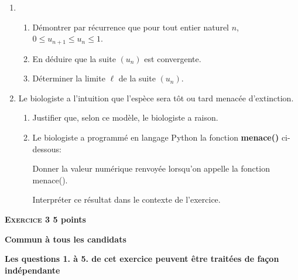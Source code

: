 \documentclass[11pt]{article}
\begin{document}
\begin{enumerate}[resume]
\item 
	\begin{enumerate}
		\item Démontrer par récurrence que pour tout entier naturel $n$,\, $0 \leqslant u_{n+1} \leqslant  u_n \leqslant 1$.
		\item En déduire que la suite $\left(u_n\right)$ est convergente.
		\item Déterminer la limite $\ell$ de la suite $\left(u_n\right)$.
	\end{enumerate}
\item Le biologiste a l'intuition que l'espèce sera tôt ou tard menacée d'extinction.
	\begin{enumerate}
		\item Justifier que, selon ce modèle, le biologiste a raison.
		\item Le biologiste a programmé en langage Python la fonction \textbf{menace()} ci-dessous:

\begin{center}
\end{center}

Donner la valeur numérique renvoyée lorsqu'on appelle la fonction menace(). 

Interpréter ce résultat dans le contexte de l'exercice.
	\end{enumerate}
\end{enumerate}

\bigskip

\textbf{\textsc{Exercice 3} \hfill 5 points}
 
\textbf{Commun à tous les candidats}

\smallskip

\textbf{Les questions 1. à 5. de cet exercice peuvent être traitées de façon indépendante}

\medskip
\end{document}
